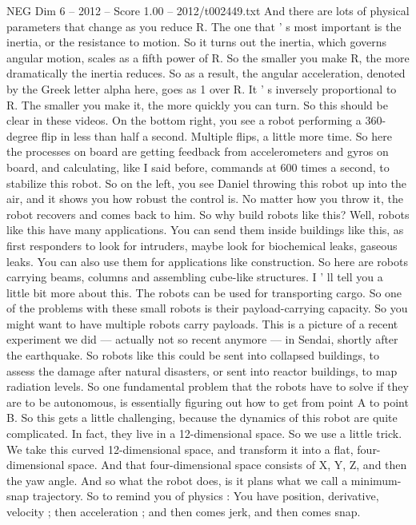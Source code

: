 \begin{textsample}{NEG Dim 6 – 2012 – Score 1.00 – 2012/t002449.txt}
And there are lots of physical parameters that change as you reduce R.
The one that ' s most important is the inertia, or the resistance to motion.
So it turns out the inertia, which governs angular motion, scales as a fifth power of R.
So the smaller you make R, the more dramatically the inertia reduces.
So as a result, the angular acceleration, denoted by the Greek letter alpha here, goes as 1 over R.
It ' s inversely proportional to R.
The smaller you make it, the more quickly you can turn.
So this should be clear in these videos.
On the bottom right, you see a robot performing a 360-degree flip in less than half a second.
Multiple flips, a little more time.
So here the processes on board are getting feedback from accelerometers and gyros on board, and calculating, like I said before, commands at 600 times a second, to stabilize this robot.
So on the left, you see Daniel throwing this robot up into the air, and it shows you how robust the control is.
No matter how you throw it, the robot recovers and comes back to him.
So why build robots like this?
Well, robots like this have many applications.
You can send them inside buildings like this, as first responders to look for intruders, maybe look for biochemical leaks, gaseous leaks.
You can also use them for applications like construction.
So here are robots carrying beams, columns and assembling cube-like structures.
I ' ll tell you a little bit more about this.
The robots can be used for transporting cargo.
So one of the problems with these small robots is their payload-carrying capacity.
So you might want to have multiple robots carry payloads.
This is a picture of a recent experiment we did — actually not so recent anymore — in Sendai, shortly after the earthquake.
So robots like this could be sent into collapsed buildings, to assess the damage after natural disasters, or sent into reactor buildings, to map radiation levels.
So one fundamental problem that the robots have to solve if they are to be autonomous, is essentially figuring out how to get from point A to point B.
So this gets a little challenging, because the dynamics of this robot are quite complicated.
In fact, they live in a 12-dimensional space.
So we use a little trick.
We take this curved 12-dimensional space, and transform it into a flat, four-dimensional space.
And that four-dimensional space consists of X, Y, Z, and then the yaw angle.
And so what the robot does, is it plans what we call a minimum-snap trajectory.
So to remind you of physics : You have position, derivative, velocity ; then acceleration ; and then comes jerk, and then comes snap.

\end{textsample}
